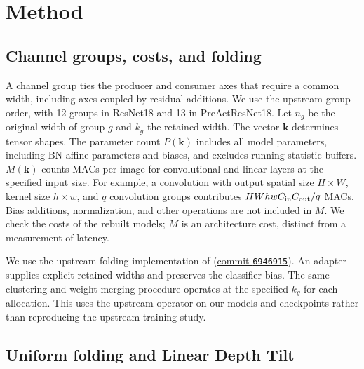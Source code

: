 \documentclass[11pt,a4paper]{article}
\begin{document}
\section{Method}
\label{sec:method}

\subsection{Channel groups, costs, and folding}

A channel group ties the producer and consumer axes that require a
common width, including axes coupled by residual additions. We use the
upstream group order, with 12 groups in ResNet18 and 13 in
PreActResNet18. Let $n_g$ be the original width of group $g$ and $k_g$ the
retained width. The vector $\mathbf k$ determines tensor shapes. The
parameter count $P(\mathbf k)$ includes all model parameters, including
BN affine parameters and biases, and excludes running-statistic buffers.
$M(\mathbf k)$ counts MACs per image for convolutional and linear layers
at the specified input size. For example, a convolution with output
spatial size $H\times W$, kernel size $h\times w$, and $q$ convolution
groups contributes $HW hw C_{\rm in} C_{\rm out}/q$ MACs. Bias additions,
normalization, and other operations are not included in $M$. We check the
costs of the rebuilt models; $M$ is an architecture cost, distinct from a
measurement of latency.

We use the upstream folding implementation of \citet{saukh2026cut}
(\href{https://github.com/osaukh/folding_as_projection/tree/694691556e8314a835178a741938dd3d4d80c171}{commit \texttt{6946915}}).
An adapter supplies explicit retained widths and preserves the classifier bias. The same
clustering and weight-merging procedure operates at the specified
$k_g$ for each allocation. This uses the upstream operator on our models
and checkpoints rather than reproducing the upstream training study.

\subsection{Uniform folding and Linear Depth Tilt}
\label{sec:tilt}
\end{document}
